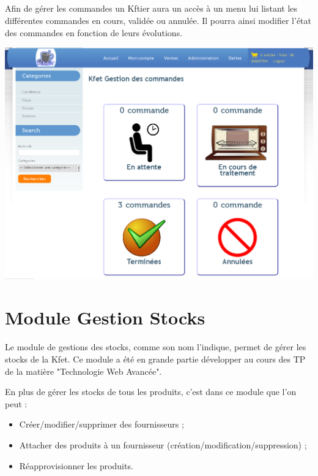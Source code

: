 \documentclass[twoside,UTF8]{EPURapport}
\begin{document}
        \paragraph{}Afin de gérer les commandes un Kftier aura un accès à un menu lui listant les différentes commandes en cours, validée ou annulée. Il pourra ainsi modifier l'état des commandes en fonction de leurs évolutions.

        \begin{center}
            \includegraphics[width=0.8\linewidth]{logos/gestionCommande.png}
        \end{center}


\chapter{Module Gestion Stocks}

Le module de gestions des stocks, comme son nom l'indique, permet de gérer les stocks de la Kfet. Ce module a été en grande partie développer au cours des TP de la matière "Technologie Web Avancée".

En plus de gérer les stocks de tous les produits, c'est dans ce module que l'on peut :
\begin{itemize}
    \item Créer/modifier/supprimer des fournisseurs ;
    \item Attacher des produits à un fournisseur (création/modification/suppression) ;
    \item Réapprovisionner les produits.
\end{itemize}
\end{document}
